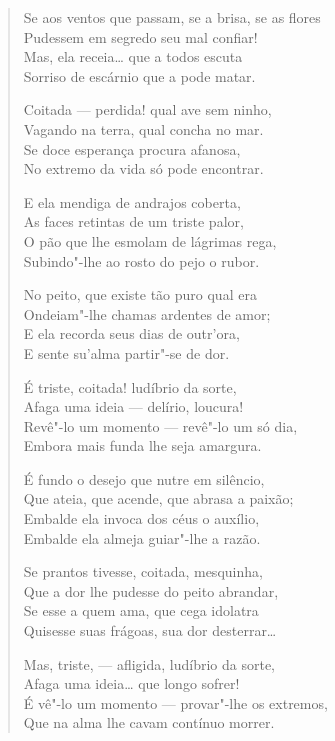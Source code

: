 \begin{verse}
Se aos ventos que passam, se a brisa, se as flores\\
Pudessem em segredo seu mal confiar!\\
Mas, ela receia\ldots{} que a todos escuta\\
Sorriso de escárnio que a pode matar.

Coitada --- perdida! qual ave sem ninho,\\
Vagando na terra, qual concha no mar.\\
Se doce esperança procura afanosa,\\
No extremo da vida só pode encontrar.

E ela mendiga de andrajos coberta,\\
As faces retintas de um triste palor,\\
O pão que lhe esmolam de lágrimas rega,\\
Subindo"-lhe ao rosto do pejo o rubor.

No peito, que existe tão puro qual era\\
Ondeiam"-lhe chamas ardentes de amor;\\
E ela recorda seus dias de outr'ora,\\
E sente su'alma partir"-se de dor.

É triste, coitada! ludíbrio da sorte,\\
Afaga uma ideia --- delírio, loucura!\\
Revê"-lo um momento --- revê"-lo um só dia,\\
Embora mais funda lhe seja amargura.

É fundo o desejo que nutre em silêncio,\\
Que ateia, que acende, que abrasa a paixão;\\
Embalde ela invoca dos céus o auxílio,\\
Embalde ela almeja guiar"-lhe a razão.

Se prantos tivesse, coitada, mesquinha,\\
Que a dor lhe pudesse do peito abrandar,\\
Se esse a quem ama, que cega idolatra\\
Quisesse suas frágoas, sua dor desterrar\ldots{}

Mas, triste, --- afligida, ludíbrio da sorte,\\
Afaga uma ideia\ldots{} que longo sofrer!\\
É vê"-lo um momento --- provar"-lhe os extremos,\\
Que na alma lhe cavam contínuo morrer.


\end{verse}
